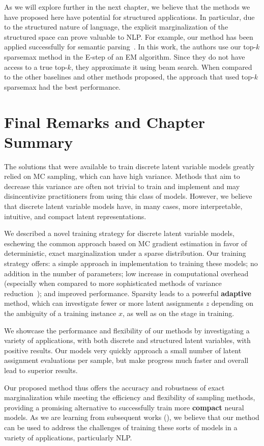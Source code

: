 As we will explore further in the next chapter, we believe that the
methods we have proposed here have potential for structured
applications. In particular, due to the structured nature of
language, the explicit marginalization of the structured space can
prove valuable to NLP. For example, our method has been applied
successfully for semantic
parsing~\citep{wang2021LearningExecutionsSemantic}. In this work, the
authors use our top-$k$ sparsemax method in the E-step of an EM
algorithm. Since they do not have access to a true top-$k$, they
approximate it using beam search. When compared to the other
baselines and other methods proposed, the approach that used top-$k$
sparsemax had the best performance.

\section{Final Remarks and Chapter Summary}

The solutions that were available to train discrete latent variable
models greatly relied on MC sampling, which can have high variance.
Methods that aim to decrease this variance are often not trivial to
train and implement and may disincentivize practitioners from
using this class of models. However, we believe that discrete latent variable models
have, in many cases, more interpretable, intuitive, and compact
latent representations.

We described a novel training strategy for discrete latent variable
models, eschewing the common approach based on MC gradient estimation
in favor of deterministic, exact marginalization under a sparse
distribution. Our training strategy offers: a simple approach in
implementation to training these models; no addition in the number of
parameters; low increase in computational overhead (especially when
compared to more sophisticated methods of variance
reduction~\citep{RB19}); and improved performance.
Sparsity leads to a powerful \textbf{adaptive} method,
which can investigate fewer or more latent assignments $z$ depending
on the ambiguity of a training instance $x$, as well as on the stage
in training.

We showcase the performance and flexibility of our
methods by investigating a variety of applications, with both discrete
and structured latent variables, with positive results. Our models
very quickly approach a small number of latent assignment evaluations
per sample, but make progress much faster and overall lead to
superior results.

Our proposed method thus offers the accuracy and robustness of exact
marginalization while meeting the efficiency and flexibility of sampling
methods, providing a promising alternative to
successfully train more \textbf{compact} neural models. As we are
learning from subsequent works (), we believe
that our method can be used to address the challenges of training
these sorts of models in a variety of applications, particularly NLP.

\cleardoublepage

\singlespacing